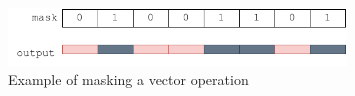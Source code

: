\begin{figure}
    \centering
    \includegraphics[width=0.8\textwidth]{Figures/RVV_Mask_example.pdf}
    \caption{Example of masking a vector operation}
    \label{fig:RVV_mask_example}
\end{figure}